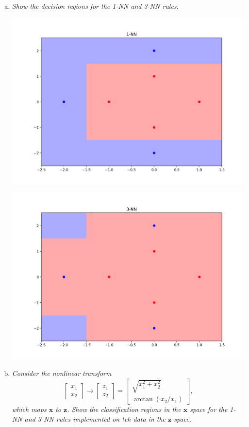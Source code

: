 \documentclass{article}
\renewcommand{\vec}[1]{\mathbf{#1}}
\begin{document}
\begin{enumerate}[(a)]
  \item \textit{Show the decision regions for the 1-NN and 3-NN rules.}

    \begin{center}
    \includegraphics[width=\textwidth]{61a1nn.png}
    \end{center}

    \begin{center}
    \includegraphics[width=\textwidth]{61a3nn.png}
    \end{center}

  \item \textit{Consider the nonlinear transform $$ \begin{bmatrix} x_1 \\ x_2 \end{bmatrix} 
      \rightarrow \begin{bmatrix} z_1 \\ z_2 \end{bmatrix} = 
        \begin{bmatrix} \sqrt{x_1^2 + x_2^2} \\ \arctan (x_2 / x_1) \end{bmatrix},$$ which 
          maps $\vec{x}$ to $\vec{z}$. Show the classification regions in the $\vec{x}$ space 
          for the 1-NN and 3-NN rules implemented on teh data in the $\vec{z}$-space.}


\end{enumerate}
\end{document}
